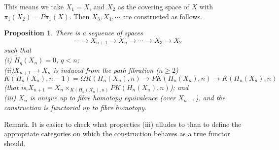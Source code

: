 \documentclass[openany,leqno]{book}  %
\newtheorem{prop}[theorem]{Proposition}
\begin{document}
This means we take $X_1 = X$, and $X_2$ as the covering space of $X$ with $\pi_1 ( X_2) = P\pi_1(X)$. Then $X_3,X_4,\cdots$ are constructed as follows.

\begin{prop}
  There is a sequence of spaces
  \[\cdots \longrightarrow  X_{n+1}\longrightarrow  X_n \longrightarrow  \cdots\longrightarrow  X_3 \longrightarrow X_2\]
  such that\\
  (i) $\widetilde{H}_q(X_n)=0$, $q<n$;\\
  (ii)$X_{n+1}\longrightarrow X_n$ is induced from the path fibration ($n\geqslant 2$)
  \[K(H_n(X_n),n-1)=\Omega K(H_n(X_n),n)\longrightarrow PK(H_n(X_n),n) \longrightarrow K(H_n(X_n),n)\]
  (that is,$X_{n+1}=X_n \times_{K(H_n(X_n),n)} PK(H_n(X_n),n)$); and \\
(iii) $X_n$ is unique up to fibre homotopy equivalence (over $X_{n-1}$), and the construction is functorial up to fibre homotopy.
\end{prop}
Remark. It is easier to check what properties (iii) alludes to than to define the appropriate categories on which the construction behaves as a true functor should.
\end{document}
